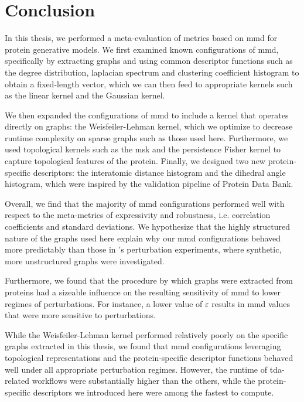 \chapter{Conclusion}\label{chap:conclusion}

In this thesis, we performed a meta-evaluation of metrics based on
\gls{mmd} for protein generative models. We first examined known
configurations of \gls{mmd}, specifically by extracting graphs and using
common descriptor functions such as the degree distribution, laplacian spectrum
and clustering coefficient histogram to obtain a fixed-length vector, which we
can then feed to appropriate kernels such as the linear kernel and the Gaussian
kernel.

We then expanded the configurations of \gls{mmd} to include a kernel that operates
directly on graphs: the Weisfeiler-Lehman kernel, which we optimize to decrease
runtime complexity on sparse graphs such as those used here. Furthermore, we
used topological kernels such as the \gls{msk} and the persistence
Fisher kernel to capture topological features of the protein. Finally, we
designed two new protein-specific descriptors: the interatomic distance
histogram and the dihedral angle histogram, which were inspired by the
validation pipeline of Protein Data Bank.

Overall, we find that the majority of \gls{mmd} configurations performed
well with respect to the meta-metrics of expressivity and robustness, i.e.
correlation coefficients and standard deviations. We hypothesize that the highly
structured nature of the graphs used here explain why our \gls{mmd}
configurations behaved more predictably than those in
\cite{obray2022evaluation}'s perturbation experiments, where synthetic, more
unstructured graphs were investigated.


Furthermore, we found that the procedure by which graphs were extracted from
proteins had a sizeable influence on the resulting sensitivity of \gls{mmd} to lower
regimes of perturbations. For instance, a lower value of $\varepsilon$ results
in \gls{mmd} values that were more sensitive to perturbations.

While the Weisfeiler-Lehman kernel performed relatively poorly on the specific
graphs extracted in this thesis, we found that \gls{mmd} configurations leveraging
topological representations and the protein-specific descriptor functions
behaved well under all appropriate perturbation regimes. However, the runtime of
\gls{tda}-related workflows were substantially higher than the others, while the
protein-specific descriptors we introduced here were among the fastest to
compute.

